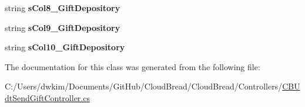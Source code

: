 \begin{DoxyCompactItemize}
\item 
string {\bfseries s\+Col8\+\_\+\+Gift\+Depository}\hypertarget{class_cloud_bread_1_1_controllers_1_1_c_b_udt_send_gift_controller_1_1_input_params_af6a3265615abb7c16f277540745b38dd}{}\label{class_cloud_bread_1_1_controllers_1_1_c_b_udt_send_gift_controller_1_1_input_params_af6a3265615abb7c16f277540745b38dd}

\item 
string {\bfseries s\+Col9\+\_\+\+Gift\+Depository}\hypertarget{class_cloud_bread_1_1_controllers_1_1_c_b_udt_send_gift_controller_1_1_input_params_ad5a38634c4af68aefb31951c1fa46441}{}\label{class_cloud_bread_1_1_controllers_1_1_c_b_udt_send_gift_controller_1_1_input_params_ad5a38634c4af68aefb31951c1fa46441}

\item 
string {\bfseries s\+Col10\+\_\+\+Gift\+Depository}\hypertarget{class_cloud_bread_1_1_controllers_1_1_c_b_udt_send_gift_controller_1_1_input_params_a720ea7f0ce2a0d66e22b803fd67473d8}{}\label{class_cloud_bread_1_1_controllers_1_1_c_b_udt_send_gift_controller_1_1_input_params_a720ea7f0ce2a0d66e22b803fd67473d8}

\end{DoxyCompactItemize}


The documentation for this class was generated from the following file\+:\begin{DoxyCompactItemize}
\item 
C\+:/\+Users/dwkim/\+Documents/\+Git\+Hub/\+Cloud\+Bread/\+Cloud\+Bread/\+Controllers/\hyperlink{_c_b_udt_send_gift_controller_8cs}{C\+B\+Udt\+Send\+Gift\+Controller.\+cs}\end{DoxyCompactItemize}
